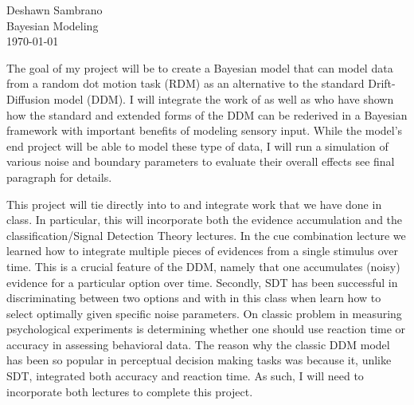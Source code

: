 \documentclass[12pt]{article} %
\begin{document}
 \begin{flushright}
	 Deshawn Sambrano\textbf{\\}
	 Bayesian Modeling\\
	 \today
 \end{flushright}
 
 
 The goal of my project will be to create a Bayesian model that can model data from a random dot motion task (RDM) as an alternative to the standard Drift-Diffusion model (DDM). I will integrate the work of \cite{Bitzer2014} as well as \cite{Fard2017} who have shown how the standard and extended forms of the DDM can be rederived in a Bayesian framework with important benefits of modeling sensory input. While the model's end project will be able to model these type of data, I will run a simulation of various noise and boundary parameters to evaluate their overall effects see final paragraph for details.
 
 This project will tie directly into to and integrate work that we have done in class. In particular, this will incorporate both the evidence accumulation and the classification/Signal Detection Theory lectures. In the cue combination lecture we learned how to integrate multiple pieces of evidences from a single stimulus over time. This is a crucial feature of the DDM, namely that one accumulates (noisy) evidence for a particular option over time. Secondly, SDT has been successful in discriminating between two options and with in this class when learn how to select optimally given specific noise parameters. 
On classic problem in measuring psychological experiments is determining whether one should use reaction time or accuracy in assessing behavioral data. The reason why the classic DDM model has been so popular in perceptual decision making tasks was because it, unlike SDT, integrated both accuracy and reaction time. As such, I will need to incorporate both lectures to complete this project. 
\end{document}
